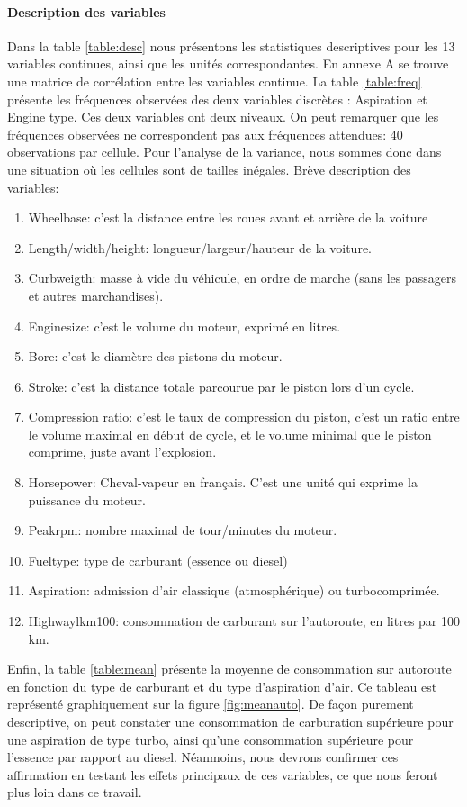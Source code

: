 \documentclass[11pt,a4paper]{article}
\begin{document}
\paragraph{Description des variables} 
Dans la table \ref{table:desc} nous présentons les statistiques descriptives pour les 13 variables continues, ainsi que les unités correspondantes. En annexe A se trouve une matrice de corrélation entre les variables continue. La table \ref{table:freq} présente les fréquences observées des deux variables discrètes : Aspiration et Engine type. Ces deux variables ont deux niveaux. On peut remarquer que les fréquences observées ne correspondent pas aux fréquences attendues: 40 observations par cellule. Pour l'analyse de la variance, nous sommes donc dans une situation où les cellules sont de tailles inégales.
Brève description des variables:
\begin{enumerate}
\item Wheelbase: c'est la distance entre les roues avant et arrière de la voiture
\item Length/width/height: longueur/largeur/hauteur de la voiture.
\item Curbweigth: masse à vide du véhicule, en ordre de marche (sans les passagers et autres marchandises).
\item Enginesize: c'est le volume du moteur, exprimé en litres.
\item Bore: c'est le diamètre des pistons du moteur.
\item Stroke: c'est la distance totale parcourue par le piston lors d'un cycle.
\item Compression ratio: c'est le taux de compression du piston, c'est un ratio entre le volume maximal en début de cycle, et le volume minimal que le piston comprime, juste avant l'explosion.
\item Horsepower: Cheval-vapeur en français. C'est une unité qui exprime la puissance du moteur.
\item Peakrpm: nombre maximal de tour/minutes du moteur.
\item Fueltype: type de carburant (essence ou diesel)
\item Aspiration: admission d'air classique (atmosphérique) ou turbocomprimée.
\item Highwaylkm100: consommation de carburant sur l'autoroute, en litres par 100 km.

\end{enumerate}

Enfin, la table \ref{table:mean} présente la moyenne de consommation sur autoroute en fonction du type de carburant et du type d'aspiration d'air.
Ce tableau est représenté graphiquement sur la figure \ref{fig:meanauto}. De façon purement descriptive, on peut constater une consommation de carburation supérieure pour une aspiration de type turbo, ainsi qu'une consommation supérieure pour l'essence par rapport au diesel. Néanmoins,  nous devrons confirmer ces affirmation en testant les effets principaux de ces variables, ce que nous feront plus loin dans ce travail.
\end{document}
